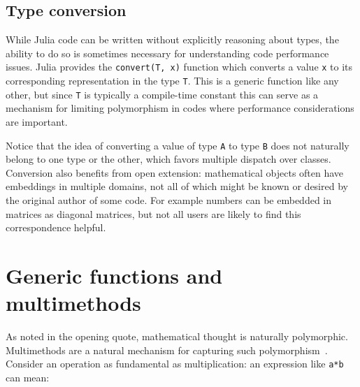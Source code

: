 \documentclass[pldi]{sigplanconf-pldi15}
\begin{document}
\subsection{Type conversion}

While Julia code can be written without
explicitly reasoning about types, the ability to do so is sometimes necessary for
understanding code performance issues. Julia provides the \verb|convert(T, x)|
function which converts a value \verb|x| to its corresponding representation in
the type \verb|T|. This is a generic function like any other, but since
\verb|T| is typically a compile-time constant this can serve as a mechanism for
limiting polymorphism in codes where performance considerations are important.

Notice that the idea of converting a value of type \verb|A| to type \verb|B|
does not naturally belong to one type or the other, which favors multiple
dispatch over classes. Conversion also benefits from open extension:
mathematical objects often have embeddings in multiple domains, not all of
which might be known or desired by the original author of some code. For
example numbers can be embedded in matrices as diagonal matrices, but not
all users are likely to find this correspondence helpful.


\section{Generic functions and multimethods}

As \cite{Poincare1908} noted in the opening quote, mathematical thought is
naturally polymorphic. Multimethods are a natural mechanism for capturing such
polymorphism~\cite{Bezanson2014b,Chen2014}. Consider an operation as
fundamental as multiplication: an expression like \verb|a*b| can mean:
\end{document}
